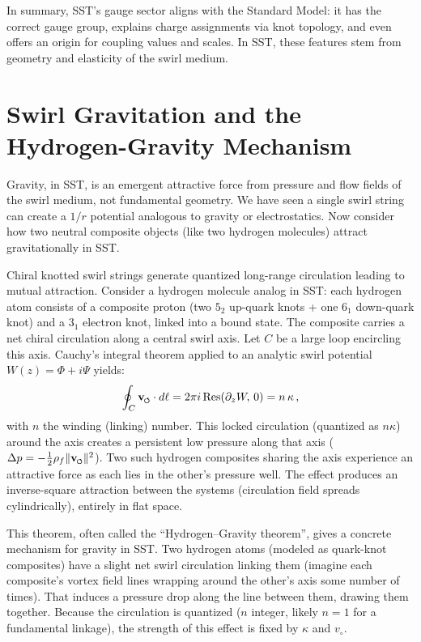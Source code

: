 \documentclass[reprint,aps,onecolumn,nofootinbib]{revtex4-2}
\newcommand{\swirlarrow}{%
    \mathchoice{\mkern-2mu\scriptstyle\boldsymbol{\circlearrowleft}}%
    {\mkern-2mu\scriptstyle\boldsymbol{\circlearrowleft}}%
    {\mkern-2mu\scriptscriptstyle\boldsymbol{\circlearrowleft}}%
    {\mkern-2mu\scriptscriptstyle\boldsymbol{\circlearrowleft}}%
}
\newcommand{\vswirl}{\mathbf{v}_{\swirlarrow}}
\begin{document}
	In summary, SST’s gauge sector aligns with the Standard Model: it has the correct gauge group, explains charge assignments via knot topology, and even offers an origin for coupling values and scales. In SST, these features stem from geometry and elasticity of the swirl medium.

    \section{Swirl Gravitation and the Hydrogen-Gravity Mechanism}
        Gravity, in SST, is an emergent attractive force from pressure and flow fields of the swirl medium, not fundamental geometry. We have seen a single swirl string can create a $1/r$ potential analogous to gravity or electrostatics. Now consider how two neutral composite objects (like two hydrogen molecules) attract gravitationally in SST.

        \begin{tcolorbox}[title=Theorem 7.1: Hydrogen-Gravity Mechanism (Swirl Attraction in Flat Space)]
        Chiral knotted swirl strings generate quantized long-range circulation leading to mutual attraction. Consider a hydrogen molecule analog in SST: each hydrogen atom consists of a composite proton (two $5_2$ up-quark knots + one $6_1$ down-quark knot) and a $3_1$ electron knot, linked into a bound state. The composite carries a net chiral circulation along a central swirl axis. Let $C$ be a large loop encircling this axis. Cauchy’s integral theorem applied to an analytic swirl potential $W(z) = \Phi + i\Psi$ yields:
        \[
            \oint_C \vswirl \cdot d\ell = 2\pi i \,\text{Res}(\partial_z W,\,0) = n\,\kappa\,,
        \]
        with $n$ the winding (linking) number. This locked circulation (quantized as $n\kappa$) around the axis creates a persistent low pressure along that axis ($\Delta p = -\frac{1}{2}\rho_f \|\vswirl\|^2$). Two such hydrogen composites sharing the axis experience an attractive force as each lies in the other’s pressure well. The effect produces an inverse-square attraction between the systems (circulation field spreads cylindrically), entirely in flat space.
        \end{tcolorbox}

        \noindent This theorem, often called the “Hydrogen–Gravity theorem”, gives a concrete mechanism for gravity in SST. Two hydrogen atoms (modeled as quark-knot composites) have a slight net swirl circulation linking them (imagine each composite’s vortex field lines wrapping around the other’s axis some number of times). That induces a pressure drop along the line between them, drawing them together. Because the circulation is quantized ($n$ integer, likely $n=1$ for a fundamental linkage), the strength of this effect is fixed by $\kappa$ and $v_{\circ}$.
\end{document}
